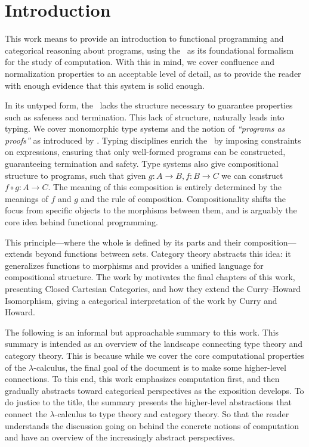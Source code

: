 \chapter*{Introduction}

This work means to provide an introduction to functional programming and categorical reasoning about programs, using the \lcalc \ as its foundational formalism for the study of computation. With this in mind, we cover confluence and normalization properties to an acceptable level of detail, as to provide the reader with enough evidence that this system is solid enough.

In its untyped form, the \lcalc \ lacks the structure necessary to guarantee properties such as safeness and termination. This lack of structure, naturally leads into typing. We cover monomorphic type systems and the notion of \textit{``programs as proofs''} as introduced by \cite{Howard1980}. Typing disciplines enrich the \lcalc\ by imposing constraints on expressions, ensuring that only well-formed programs can be constructed, guaranteeing termination and safety. Type systems also give compositional structure to programs, such that given
\(
g : A \to B, f : B \to C
\) we can construct \(
f \circ g : A \to C.
\)  
The meaning of this composition is entirely determined by the meanings of \(f\) and \(g\) and the rule of composition. Compositionality shifts the focus from specific objects to the morphisms between them, and is arguably the core idea behind functional programming.

This principle---where the whole is defined by its parts and their composition---extends beyond functions between sets. Category theory abstracts this idea: it generalizes functions to morphisms and provides a unified language for compositional structure. The work by \cite{Lambek1980} motivates the final chapters of this work, presenting Closed Cartesian Categories, and how they extend the Curry--Howard Isomorphism, giving a categorical interpretation of the work by Curry and Howard.

The following is an informal but approachable summary to this work.
This summary is intended as an overview of the landscape connecting type theory 
and category theory. This is because
while we cover the core computational properties of the $\lambda$-calculus, the final goal of the document
is to make some higher-level connections. To this end, this work emphasizes computation first, 
and then gradually abstracts toward categorical perspectives as the exposition 
develops. To do justice to the title, the summary presents the
higher-level abstractions that connect the $\lambda$-calculus to type theory and category 
theory. So that the reader understands the discussion going on behind the concrete notions
of computation and have an overview of the increasingly abstract perspectives.

